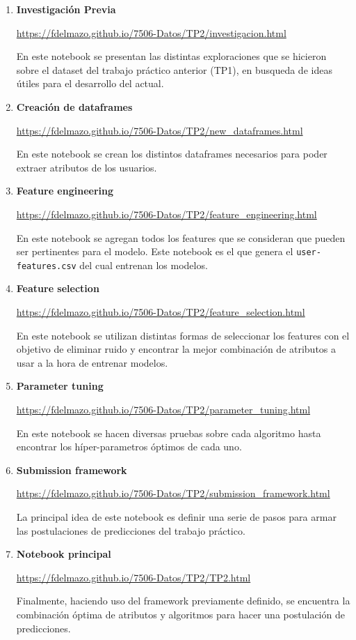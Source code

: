 \documentclass[a4paper]{article}
\begin{document}
\begin{enumerate} 
	\item \textbf{Investigación Previa}

	\small{\url{https://fdelmazo.github.io/7506-Datos/TP2/investigacion.html}}

	En este notebook se presentan las distintas exploraciones que se hicieron sobre el dataset del trabajo práctico anterior (TP1), en busqueda de ideas útiles para el desarrollo del actual.

	\item \textbf{Creación de dataframes}

	\small{\url{https://fdelmazo.github.io/7506-Datos/TP2/new_dataframes.html}}

	En este notebook se crean los distintos dataframes necesarios para poder extraer atributos de los usuarios.

	\item \textbf{Feature engineering}

	\small{\url{https://fdelmazo.github.io/7506-Datos/TP2/feature_engineering.html}}

	En este notebook se agregan todos los features que se consideran que pueden ser pertinentes para el modelo. Este notebook es el que genera el \texttt{user-features.csv} del cual entrenan los modelos.

	\item \textbf{Feature selection}

	\small{\url{https://fdelmazo.github.io/7506-Datos/TP2/feature_selection.html}}

	En este notebook se utilizan distintas formas de seleccionar los features con el objetivo de eliminar ruido y encontrar la mejor combinación de atributos a usar a la hora de entrenar modelos.

	\item \textbf{Parameter tuning}

	\small{\url{https://fdelmazo.github.io/7506-Datos/TP2/parameter_tuning.html}}

	En este notebook se hacen diversas pruebas sobre cada algoritmo hasta encontrar los híper-parametros óptimos de cada uno.

	\item \textbf{Submission framework}

	\small{\url{https://fdelmazo.github.io/7506-Datos/TP2/submission_framework.html}}

	La principal idea de este notebook es definir una serie de pasos para armar las postulaciones de predicciones del trabajo práctico.

	\item \textbf{Notebook principal}

	\small{\url{https://fdelmazo.github.io/7506-Datos/TP2/TP2.html}}

	Finalmente, haciendo uso del framework previamente definido, se encuentra la combinación óptima de atributos y algoritmos para hacer una postulación de predicciones.

\end{enumerate}
\end{document}
